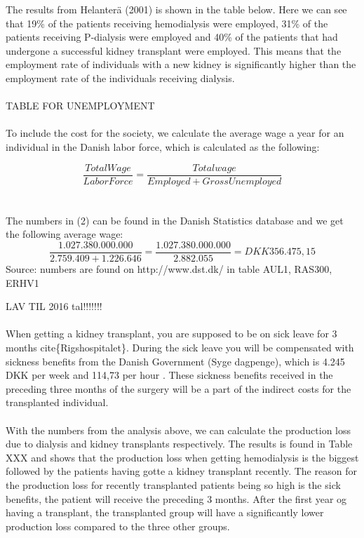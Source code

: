 \documentclass[a4paper,12pt]{article}
\begin{document}
The results from Helanterä (2001) is shown in the table below. Here we can see that 19\% of the patients receiving hemodialysis were employed, 31\% of the patients receiving P-dialysis were employed and 40\% of the patients that had undergone a successful kidney transplant were employed. This means that the employment rate of individuals with a new kidney is significantly higher than the employment rate of the individuals receiving dialysis. 
\\\\
TABLE FOR UNEMPLOYMENT 
\\\\
To include the cost for the society, we calculate the average wage a year for an individual in the Danish labor force, which is calculated as the following: 

\begin{equation}
\dfrac{Total Wage}{Labor Force} = \dfrac{Total wage}{Employed + Gross Unemployed} 
\end{equation}
\\\\
The numbers in (2) can be found in the Danish Statistics database and we get the following average wage: 
\begin{equation}
\dfrac{1.027.380.000.000}{2.759.409+1.226.646} = \dfrac{1.027.380.000.000}{2.882.055} = DKK356.475,15
\end{equation}
{\small Source: numbers are found on http://www.dst.dk/ in table AUL1, RAS300, ERHV1 }

LAV TIL 2016 tal!!!!!!!
\\\\
When getting a kidney transplant, you are supposed to be on sick leave for 3 months cite\{Rigshospitalet\}. During the sick leave you will be compensated with sickness benefits from the Danish Government (Syge dagpenge), which is 4.245 DKK per week and 114,73 per hour \cite{borger.dk}. These sickness benefits received in the preceding three months of the surgery will be a part of the indirect costs for the transplanted individual.
\\\\
With the numbers from the analysis above, we can calculate the production loss due to dialysis and kidney transplants respectively. The results is found in Table XXX and shows that the production loss when getting hemodialysis is the biggest followed by the patients having gotte a kidney transplant recently. The reason for the production loss for recently transplanted patients being so high is the sick benefits, the patient will receive the preceding 3 months. After the first year og having a transplant, the transplanted group will have a significantly lower production loss compared to the three other groups. 
\end{document}
